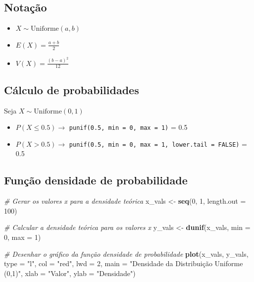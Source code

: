 \documentclass[
]{book}
\newenvironment{Shaded}{\begin{snugshade}}{\end{snugshade}}
\newcommand{\AttributeTok}[1]{\textcolor[rgb]{0.13,0.29,0.53}{#1}}
\newcommand{\CommentTok}[1]{\textcolor[rgb]{0.56,0.35,0.01}{\textit{#1}}}
\newcommand{\DecValTok}[1]{\textcolor[rgb]{0.00,0.00,0.81}{#1}}
\newcommand{\FunctionTok}[1]{\textcolor[rgb]{0.13,0.29,0.53}{\textbf{#1}}}
\newcommand{\NormalTok}[1]{#1}
\newcommand{\OtherTok}[1]{\textcolor[rgb]{0.56,0.35,0.01}{#1}}
\newcommand{\StringTok}[1]{\textcolor[rgb]{0.31,0.60,0.02}{#1}}
\providecommand{\tightlist}{%
  \setlength{\itemsep}{0pt}\setlength{\parskip}{0pt}}
\begin{document}
\subsection{Notação}\label{notauxe7uxe3o}

\begin{itemize}
\tightlist
\item
  \(X \sim \text{Uniforme}(a, b)\)
\item
  \(E(X) = \frac{a + b}{2}\)
\item
  \(V(X) = \frac{(b - a)^2}{12}\)
\end{itemize}

\subsection{Cálculo de probabilidades}\label{cuxe1lculo-de-probabilidades-4}

Seja \(X\sim \text{Uniforme}(0,1)\)

\begin{itemize}
\item
  \(P(X\leq 0.5) \to\) \texttt{punif(0.5,\ min\ =\ 0,\ max\ =\ 1)} = 0.5
\item
  \(P(X > 0.5) \to\) \texttt{punif(0.5,\ min\ =\ 0,\ max\ =\ 1,\ lower.tail\ =\ FALSE)}
  = 0.5
\end{itemize}

\subsection{Função densidade de probabilidade}\label{funuxe7uxe3o-densidade-de-probabilidade}

\begin{Shaded}
\begin{Highlighting}[]
\CommentTok{\# Gerar os valores x para a densidade teórica}
\NormalTok{x\_vals }\OtherTok{\textless{}{-}} \FunctionTok{seq}\NormalTok{(}\DecValTok{0}\NormalTok{, }\DecValTok{1}\NormalTok{, }\AttributeTok{length.out =} \DecValTok{100}\NormalTok{)}

\CommentTok{\# Calcular a densidade teórica para os valores x}
\NormalTok{y\_vals }\OtherTok{\textless{}{-}} \FunctionTok{dunif}\NormalTok{(x\_vals, }\AttributeTok{min =} \DecValTok{0}\NormalTok{, }\AttributeTok{max =} \DecValTok{1}\NormalTok{)}

\CommentTok{\# Desenhar o gráfico da função densidade de probabilidade}
\FunctionTok{plot}\NormalTok{(x\_vals, y\_vals, }\AttributeTok{type =} \StringTok{"l"}\NormalTok{, }
     \AttributeTok{col =} \StringTok{"red"}\NormalTok{, }\AttributeTok{lwd =} \DecValTok{2}\NormalTok{, }
     \AttributeTok{main =} \StringTok{"Densidade da Distribuição Uniforme (0,1)"}\NormalTok{,}
     \AttributeTok{xlab =} \StringTok{"Valor"}\NormalTok{, }\AttributeTok{ylab =} \StringTok{"Densidade"}\NormalTok{)}
\end{Highlighting}
\end{Shaded}
\end{document}

